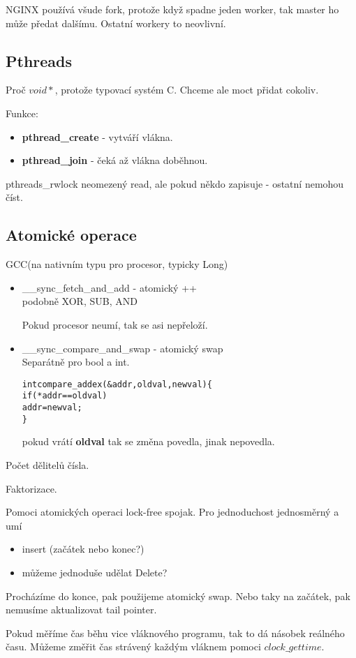 \begin{example}
	NGINX používá všude fork, protože když spadne jeden worker, tak master ho může předat dalšímu. Ostatní workery to neovlivní.
\end{example}

\subsection{Pthreads}

Proč $void*$, protože typovací systém C. Chceme ale moct přidat cokoliv.

Funkce:
\begin{itemize}
	\item \textbf{pthread\_create} - vytváří vlákna.
	\item \textbf{pthread\_join} - čeká až vlákna doběhnou.
\end{itemize}

pthreads\_rwlock
neomezený read, ale pokud někdo zapisuje - ostatní nemohou číst.

\subsection{Atomické operace}

GCC(na nativním typu pro procesor, typicky Long)
\begin{itemize}
	\item \_\_sync\_fetch\_and\_add - atomický ++\\
		podobně XOR, SUB, AND

		Pokud procesor neumí, tak se asi nepřeloží.
	\item \_\_sync\_compare\_and\_swap - atomický swap\\
		Separátně pro bool a int.
	\begin{alltt}
		int compare_addex(\& addr, oldval, newval)\{
		\tab if(*addr == oldval)
		\tab \tab *addr = newval;
		\tab \}
	\end{alltt}
	pokud vrátí \textbf{oldval} tak se změna povedla, jinak nepovedla.
\end{itemize}

\begin{exercise}
	Počet dělitelů čísla.
\end{exercise}

\begin{exercise}
	Faktorizace.
\end{exercise}

\begin{exercise}
	Pomoci atomických operaci lock-free spojak.
	Pro jednoduchost jednosměrný a umí
	\begin{itemize}
		\item insert (začátek nebo konec?)
		\item můžeme jednoduše udělat Delete?
	\end{itemize}

	Procházíme do konce, pak použijeme atomický swap.
	Nebo taky na začátek, pak nemusíme aktualizovat tail pointer.
\end{exercise}

\begin{note}
	Pokud měříme čas běhu vice vláknového programu, tak to dá násobek reálného času.
	Můžeme změřit čas strávený každým vláknem pomoci $clock\_gettime$.
\end{note}
